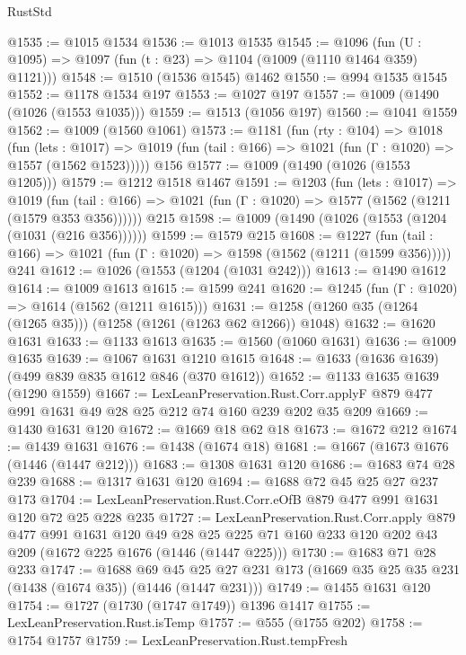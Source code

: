 \begin{lexlean}{RustStd}
\begin{coremodule}
@1535 := @1015 @1534
@1536 := @1013 @1535
@1545 := @1096 (fun (U : @1095) => @1097 (fun (t : @23) => @1104 (@1009 (@1110 @1464 @359) @1121)))
@1548 := @1510 (@1536 @1545) @1462
@1550 := @994 @1535 @1545
@1552 := @1178 @1534 @197
@1553 := @1027 @197
@1557 := @1009 (@1490 (@1026 (@1553 @1035)))
@1559 := @1513 (@1056 @197)
@1560 := @1041 @1559
@1562 := @1009 (@1560 @1061)
@1573 := @1181
    (fun (rty : @104) =>
    @1018
      (fun (lets : @1017) =>
      @1019 (fun (tail : @166) => @1021 (fun (Γ : @1020) => @1557 (@1562 @1523)))))
    @156
@1577 := @1009 (@1490 (@1026 (@1553 @1205)))
@1579 := @1212 @1518 @1467
@1591 := @1203
    (fun (lets : @1017) =>
    @1019 (fun (tail : @166) => @1021 (fun (Γ : @1020) => @1577 (@1562 (@1211 (@1579 @353 @356))))))
    @215
@1598 := @1009 (@1490 (@1026 (@1553 (@1204 (@1031 (@216 @356))))))
@1599 := @1579 @215
@1608 := @1227
    (fun (tail : @166) => @1021 (fun (Γ : @1020) => @1598 (@1562 (@1211 (@1599 @356)))))
    @241
@1612 := @1026 (@1553 (@1204 (@1031 @242)))
@1613 := @1490 @1612
@1614 := @1009 @1613
@1615 := @1599 @241
@1620 := @1245 (fun (Γ : @1020) => @1614 (@1562 (@1211 @1615)))
@1631 := @1258 (@1260 @35 (@1264 (@1265 @35))) (@1258 (@1261 (@1263 @62 @1266)) @1048)
@1632 := @1620 @1631
@1633 := @1133 @1613
@1635 := @1560 (@1060 @1631)
@1636 := @1009 @1635
@1639 := @1067 @1631 @1210 @1615
@1648 := @1633 (@1636 @1639) (@499 @839 @835 @1612 @846 (@370 @1612))
@1652 := @1133 @1635 @1639 (@1290 @1559)
@1667 := LexLeanPreservation.Rust.Corr.applyF
    @879
    @477
    @991
    @1631
    @49
    @28
    @25
    @212
    @74
    @160
    @239
    @202
    @35
    @209
@1669 := @1430 @1631 @120
@1672 := @1669 @18 @62 @18
@1673 := @1672 @212
@1674 := @1439 @1631
@1676 := @1438 (@1674 @18)
@1681 := @1667 (@1673 @1676 (@1446 (@1447 @212)))
@1683 := @1308 @1631 @120
@1686 := @1683 @74 @28 @239
@1688 := @1317 @1631 @120
@1694 := @1688 @72 @45 @25 @27 @237 @173
@1704 := LexLeanPreservation.Rust.Corr.eOfB @879 @477 @991 @1631 @120 @72 @25 @228 @235
@1727 := LexLeanPreservation.Rust.Corr.apply
    @879
    @477
    @991
    @1631
    @120
    @49
    @28
    @25
    @225
    @71
    @160
    @233
    @120
    @202
    @43
    @209
    (@1672 @225 @1676 (@1446 (@1447 @225)))
@1730 := @1683 @71 @28 @233
@1747 := @1688
    @69
    @45
    @25
    @27
    @231
    @173
    (@1669 @35 @25 @35 @231 (@1438 (@1674 @35)) (@1446 (@1447 @231)))
@1749 := @1455 @1631 @120
@1754 := @1727 (@1730 (@1747 @1749)) @1396 @1417
@1755 := LexLeanPreservation.Rust.isTemp
@1757 := @555 (@1755 @202)
@1758 := @1754 @1757
@1759 := LexLeanPreservation.Rust.tempFresh

\end{coremodule}
\end{lexlean}
